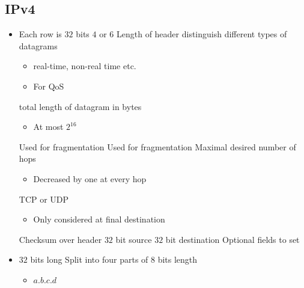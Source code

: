 \subsection{IPv4}
\begin{itemize}
        \begin{itemize}
            \item Each row is $32$ bits
             $4$ or $6$
             Length of header
             distinguish different types of datagrams
                \begin{itemize}
                    \item real-time, non-real time etc.
                    \item For QoS
                \end{itemize}
             total length of datagram in bytes
                \begin{itemize}
                    \item At most $2^{16}$
                \end{itemize}
                 
             Used for fragmentation
             Used for fragmentation
             Maximal desired number of hops
                \begin{itemize}
                    \item Decreased by one at every hop
                \end{itemize}
             TCP or UDP
                \begin{itemize}
                    \item Only considered at final destination
                \end{itemize}
             Checksum over header
             $32$ bit source
             $32$ bit destination
             Optional fields to set
        \end{itemize}
        \begin{itemize}
            \item $32$ bits long
             Split into four parts of $8$ bits length
                \begin{itemize}
                    \item $a.b.c.d$

\end{itemize}
\end{itemize}
\end{itemize}
